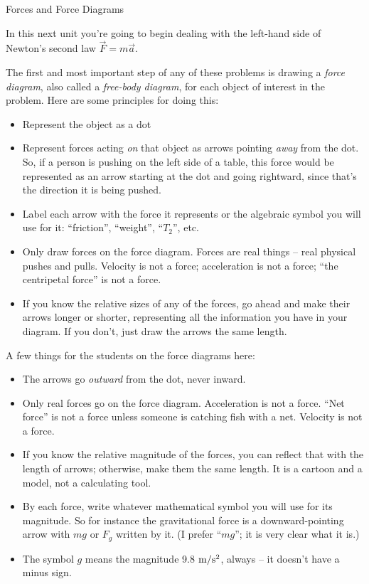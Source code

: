 \documentclass[12pt]{article}
\newcommand{\BC}{\begin{center}}
\newcommand{\EC}{\end{center}}
\newcommand{\BI}{\begin{itemize}}
\newcommand{\EI}{\end{itemize}}
\begin{document}
\Large
\centerline{}

\normalsize
\centerline{}

\medskip

\BC
{\Large Forces and Force Diagrams} 
\EC

In this next unit you're going to begin dealing with the left-hand side of Newton's second law $\vec F = m \vec a$.

The first and most important step of any of these problems is drawing a {\it force diagram}, also called a {\it free-body diagram}, for 
each object of interest in the problem. Here are some principles for doing this:

\BI
\item Represent the object as a dot
\item Represent forces acting {\it on} that object as arrows pointing {\it away} from the dot. So, if a person is pushing on the left side of a 
  table, this force would be represented as an arrow starting at the dot and going rightward, since that's the direction it is being pushed.
\item Label each arrow with the force it represents or the algebraic symbol you will use for it: ``friction'', ``weight'', ``$T_2$'', etc.
\item Only draw forces on the force diagram. Forces are real things -- real physical pushes and pulls. Velocity is not a force; acceleration is not
  a force; ``the centripetal force'' is not a force. 
\item If you know the relative sizes of any of the forces, go ahead and make their arrows longer or shorter, representing all the information
  you have in your diagram. If you don't, just draw the arrows the same length.
\EI

{\color{Red}

A few things for the students on the force diagrams here:

\begin{itemize}
	\item The arrows go {\it outward} from the dot, never inward.
	\item Only real forces go on the force diagram. Acceleration is not a force. ``Net force'' is not a force unless someone is catching fish with a net. Velocity is not a force.
	\item If you know the relative magnitude of the forces, you can reflect that with the length of arrows; otherwise, make them the same length. It is a cartoon and a model, not a calculating tool.
	\item By each force, write whatever mathematical symbol you will use for its magnitude. So for instance the gravitational force is a downward-pointing arrow with $mg$ or $F_g$ written by it. (I prefer ``$mg$''; it is very clear what it is.)
	\item The symbol $g$ means the magnitude 9.8 $\rm m/\rm s^2$, always -- it doesn't have a minus sign.
\end{itemize}
	

}
\end{document}
